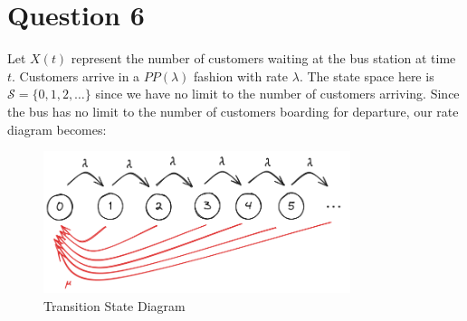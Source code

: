 \documentclass[12pt]{article}
\begin{document}
\section*{Question 6}

Let $X(t)$ represent the number of customers waiting at the bus station at time $t$. Customers arrive in a $PP(\lambda)$ fashion with rate $\lambda$. The state space here is $\mathcal{S} = \{0,1,2,\dots\}$ since we have no limit to the number of customers arriving. Since the bus has no limit to the number of customers boarding for departure, our rate diagram becomes: 

\begin{figure}[H]
    \centering
    \includegraphics[width=0.8\textwidth]{Images/Q6.png}
    \caption{Transition State Diagram}
    \label{fig:6-trans}
\end{figure} 
\end{document}
